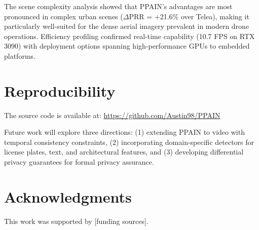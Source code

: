 \documentclass[preprint,12pt]{elsarticle}
\begin{document}
The scene complexity analysis showed that PPAIN's advantages are most pronounced in complex urban scenes ($\Delta$PRR = +21.6\% over Telea), making it particularly well-suited for the dense aerial imagery prevalent in modern drone operations. Efficiency profiling confirmed real-time capability (10.7 FPS on RTX 3090) with deployment options spanning high-performance GPUs to embedded platforms.

\section*{Reproducibility}
The source code is available at: \url{https://github.com/Austin98/PPAIN}

Future work will explore three directions: (1) extending PPAIN to video with temporal consistency constraints, (2) incorporating domain-specific detectors for license plates, text, and architectural features, and (3) developing differential privacy guarantees for formal privacy assurance.

\section*{Acknowledgments}
This work was supported by [funding sources].



\end{document}
